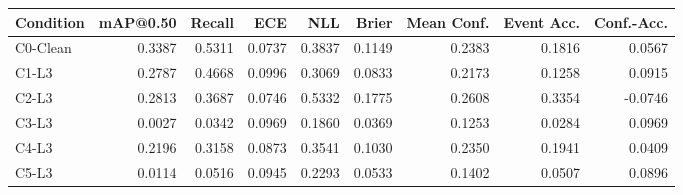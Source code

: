 \begin{tabular}{lrrrrrrrr}
\toprule
Condition & mAP@0.50 & Recall & ECE & NLL & Brier & Mean Conf. & Event Acc. & Conf.-Acc. \\
\midrule
C0-Clean & 0.3387 & 0.5311 & 0.0737 & 0.3837 & 0.1149 & 0.2383 & 0.1816 & 0.0567 \\
C1-L3 & 0.2787 & 0.4668 & 0.0996 & 0.3069 & 0.0833 & 0.2173 & 0.1258 & 0.0915 \\
C2-L3 & 0.2813 & 0.3687 & 0.0746 & 0.5332 & 0.1775 & 0.2608 & 0.3354 & -0.0746 \\
C3-L3 & 0.0027 & 0.0342 & 0.0969 & 0.1860 & 0.0369 & 0.1253 & 0.0284 & 0.0969 \\
C4-L3 & 0.2196 & 0.3158 & 0.0873 & 0.3541 & 0.1030 & 0.2350 & 0.1941 & 0.0409 \\
C5-L3 & 0.0114 & 0.0516 & 0.0945 & 0.2293 & 0.0533 & 0.1402 & 0.0507 & 0.0896 \\
\bottomrule
\end{tabular}
